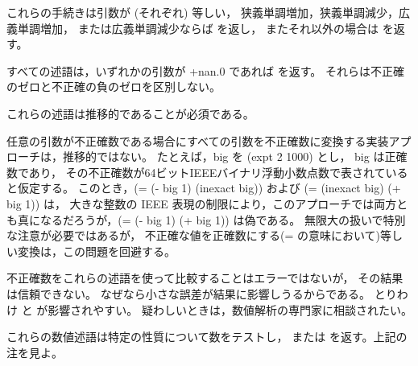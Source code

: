 \begin{entry}{%
}

これらの手続きは引数が (それぞれ) 等しい，
狭義単調増加，狭義単調減少，広義単調増加，
または広義単調減少ならば \schtrue{} を返し，
またそれ以外の場合は \schfalse{} を返す。

すべての述語は，いずれかの引数が {\cf +nan.0} であれば \schfalse{} を返す。
それらは不正確のゼロと不正確の負のゼロを区別しない。

これらの述語は推移的であることが必須である。

\begin{note}
任意の引数が不正確数である場合にすべての引数を不正確数に変換する実装アプローチは，推移的ではない。
たとえば，{\cf big} を {\cf (expt 2 1000)} とし， {\cf big} は正確数であり，
その不正確数が64ビットIEEEバイナリ浮動小数点数で表されていると仮定する。
このとき，{\cf (= (- big 1) (inexact big))} および {\cf (= (inexact big) (+ big 1))} は，
大きな整数の IEEE 表現の制限により，このアプローチでは両方とも真になるだろうが，{\cf (= (- big 1) (+ big 1))} は偽である。
無限大の扱いで特別な注意が必要ではあるが，
不正確な値を正確数にする({\cf =} の意味において)等しい変換は，この問題を回避する。
\end{note}

\begin{note}
不正確数をこれらの述語を使って比較することはエラーではないが，
その結果は信頼できない。
なぜなら小さな誤差が結果に影響しうるからである。
とりわけ \ide{=} と  が影響されやすい。
疑わしいときは，数値解析の専門家に相談されたい。
\end{note}

\end{entry}

\begin{entry}{%
}

これらの数値述語は特定の性質について数をテストし，
\schtrue{} または \schfalse を返す。上記の注を見よ。

\end{entry}

